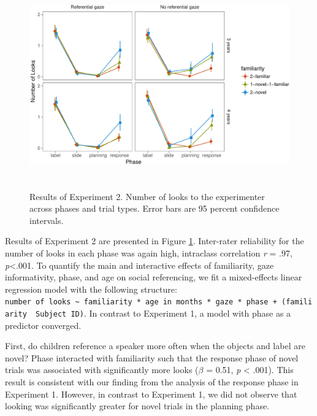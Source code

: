 \documentclass[10pt, letterpaper]{article}
\newenvironment{CodeChunk}{}{}
\begin{document}
\begin{CodeChunk}
\begin{figure}[h]

{\centering \includegraphics[width=5.75in,height=3.5in]{figs/results_e2-1} 

}

\caption[Results of Experiment 2]{Results of Experiment 2. Number of looks to the experimenter across phases and trial types. Error bars are 95 percent confidence intervals.}\label{fig:results_e2}
\end{figure}
\end{CodeChunk}

Results of Experiment 2 are presented in Figure \ref{fig:results_e2}.
Inter-rater reliability for the number of looks in each phase was again
high, intraclass correlation \emph{r} = .97, \emph{p}\textless{}.001. To
quantify the main and interactive effects of familiarity, gaze
informativity, phase, and age on social referencing, we fit a
mixed-effects linear regression model with the following structure:
\texttt{number\ of\ looks\ \textasciitilde{}\ familiarity\ *\ age\ in\ months\ *\ gaze\ *\ phase\ +\ (familiarity\ \textbar{}\ Subject\ ID)}.
In contrast to Experiment 1, a model with phase as a predictor
converged.

First, do children reference a speaker more often when the objects and
label are novel? Phase interacted with familiarity such that the
response phase of novel trials was associated with significantly more
looks (\(\beta\) = 0.51, \emph{p} \textless{} .001). This result is
consistent with our finding from the analysis of the response phase in
Experiment 1. However, in contrast to Experiment 1, we did not observe
that looking was significantly greater for novel trials in the planning
phase.
\end{document}
